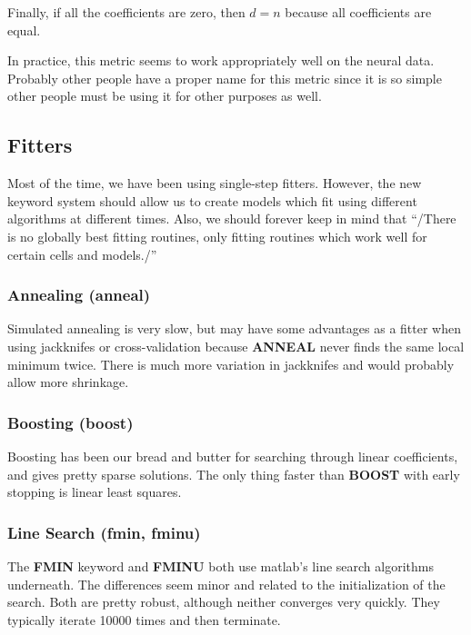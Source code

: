 \documentclass[11pt]{article}
\begin{document}
  Finally, if all the coefficients are zero, then $d=n$ because all coefficients are equal. 

  In practice, this metric seems to work appropriately well on the neural data. Probably other people have a proper name for this metric since it is so simple other people must be using it for other purposes as well.
     
\subsection{Fitters}
\label{sec-2.8}


   Most of the time, we have been using single-step fitters. However, the new keyword system should allow us to create models which fit using different algorithms at different times. Also, we should forever keep in mind that ``/There is no globally best fitting routines, only fitting routines which work well for certain cells and models./''

\subsubsection{Annealing (anneal)}
\label{sec-2.8.1}


    Simulated annealing is very slow, but may have some advantages as a fitter when using jackknifes or cross-validation because \textbf{ANNEAL} never finds the same local minimum twice. There is much more variation in jackknifes and would probably allow more shrinkage. 

\subsubsection{Boosting (boost)}
\label{sec-2.8.2}


    Boosting has been our bread and butter for searching through linear coefficients, and gives pretty sparse solutions. The only thing faster than \textbf{BOOST} with early stopping is linear least squares. 

\subsubsection{Line Search (fmin, fminu)}
\label{sec-2.8.3}


    The \textbf{FMIN} keyword and \textbf{FMINU} both use matlab's line search algorithms underneath. The differences seem minor and related to the initialization of the search. Both are pretty robust, although neither converges very quickly. They typically iterate 10000 times and then terminate.
\end{document}
